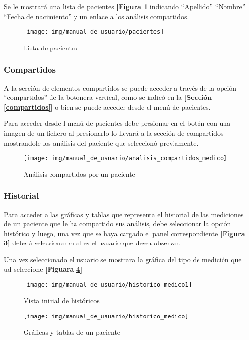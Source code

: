 Se le mostrará una lista de pacientes \textbf{[Figura \ref{pacientes}]}indicando ``Apellido'' ``Nombre'' ``Fecha de nacimiento'' y un enlace a los análisis compartidos.

	\begin{figure}
		\centering
		\texttt{[image: img/manual\_de\_usuario/pacientes]}
		\caption{Lista de pacientes}
		\label{pacientes}
	\end{figure}

\subsubsection{Compartidos}
A la sección de elementos compartidos se puede acceder a través de la opción ``compartidos'' de la botonera vertical, como se indicó en la \textbf{[Sección \ref{compartidos}]} o bien se puede acceder desde el menú de pacientes.


Para acceder desde l menú de pacientes debe presionar en el botón con una imagen de un fichero al presionarlo lo llevará a la sección de compartidos mostrandole los análisis del paciente que seleccionó previamente.

	\begin{figure}
		\centering
		\texttt{[image: img/manual\_de\_usuario/analisis\_compartidos\_medico]}
		\caption{Análisis compartidos por un paciente}
		\label{analisis_compartidos_medico}
	\end{figure}

\subsubsection{Historial}
Para acceder a las gráficas y tablas que representa el historial de las mediciones de un paciente que le ha compartido sus análisis, debe seleccionar la opción histórico y luego, una vez que se haya cargado el panel correspondiente \textbf{[Figura \ref{historico_medico1}]} deberá seleccionar cual es el  usuario que desea observar. 

Una vez seleccionado el usuario se mostrara la gráfica del tipo de medición que ud seleccione \textbf{[Figuara \ref{historico_medico}]}
	\begin{figure}
		\centering
		\texttt{[image: img/manual\_de\_usuario/historico\_medico1]}
		\caption{Vista inicial de históricos}
		\label{historico_medico1}
	\end{figure}
	

	\begin{figure}
		\centering
		\texttt{[image: img/manual\_de\_usuario/historico\_medico]}
		\caption{Gráficas y tablas de un paciente}
		\label{historico_medico}
	\end{figure}



\stopcontents


